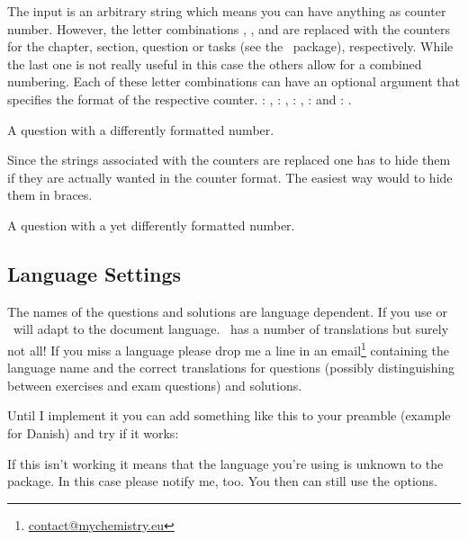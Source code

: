 \documentclass[load-preamble+,scrartcl={DIV10}]{cnltx-doc}
\begin{document}
The input is an arbitrary string which means you can have anything as counter
number.  However, the letter combinations , ,  and
 are replaced with the counters for the chapter, section, question
or tasks (see the \Tasks\ package), respectively.  While the last one is not
really useful in this case the others allow for a combined numbering.  Each of
these letter combinations can have an optional argument that specifies the
format of the respective counter. : , :
, : , :  and :
.
\begin{example}
  \begin{question}
    A question with a differently formatted number.
  \end{question}
\end{example}
Since the strings associated with the counters are replaced one has to hide
them if they are actually wanted in the counter format.  The easiest way would
to hide them in braces.
\begin{example}
  \begin{question}
    A question with a yet differently formatted number.
  \end{question}
\end{example}

\subsection{Language Settings}
The names of the questions and solutions are language dependent.  If you use
 or  \ExSheets\ will adapt to the document language.
\ExSheets\ has a number of translations but surely not all!  If you miss a
language please drop me a line in an
email\footnote{\href{mailto:contact@mychemistry.eu}{contact@mychemistry.eu}}
containing the  language name and the correct translations for
questions (possibly distinguishing between exercises and exam questions) and
solutions.

Until I implement it you can add something like this to your preamble (example
for Danish) and try if it works:
\begin{sourcecode}
\end{sourcecode}
If this isn't working it means that the language you're using is unknown to
the  package.  In this case please notify me, too.  You then
can still use the  options.
\end{document}
